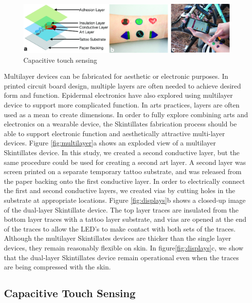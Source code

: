 \documentclass{sigchi}
\begin{document}
\begin{figure}
\centering
\includegraphics[width=1\textwidth]{figures/Figure8}
\caption{Capacitive touch sensing}
\vspace{-8pt}
\label{fig:capacitive}
\end{figure}
Multilayer devices can be fabricated for aesthetic or electronic purposes. In printed circuit board design, multiple layers are often needed to achieve desired form and function. Epidermal electronics have also explored using multilayer device to support more complicated function. In arts practices, layers are often used as a mean to create dimensions. In order to fully explore combining arts and electronics on a wearable device, the Skintillates fabrication process should be able to support electronic function and aesthetically attractive multi-layer devices. Figure \ref{fig:multilayer}a shows an exploded view of a multilayer Skintillates device. In this study, we created a second conductive layer, but the same procedure could be used for creating a second art layer. A second layer was screen printed on a separate temporary tattoo substrate, and was released from the paper backing onto the first conductive layer. In order to electrically connect the first and second conductive layers, we created vias by cutting holes in the substrate at appropriate locations. Figure \ref{fig:displays}b shows a closed-up image of the dual-layer Skintillate device. The top layer traces are insulated from the bottom layer traces with a tattoo layer substrate, and vias are opened at the end of the traces to allow the LED's to make contact with both sets of the traces. Although the multilayer Skintillates devices are thicker than the single layer devices, they remain reasonably flexible on skin. In figure\ref{fig:displays}c, we show that the dual-layer Skintillates device remain operational even when the traces are being compressed with the skin. 


\subsection{Capacitive Touch Sensing}
\end{document}
